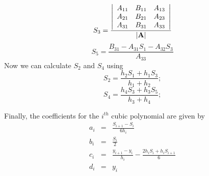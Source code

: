 %
\begin{equation}
    S_3 = \frac{
    \left|%
    \begin{array}{ccc}
       A_{11} & B_{11} & A_{13} \\
       A_{21} & B_{21} & A_{23} \\
       A_{31} & B_{31} & A_{33} \\
    \end{array}%
    \right|
    }
    {\mathbf{| \mathbf{A}|}}
\end{equation}
%
\begin{equation}
     S_5 = \frac{B_{31} - A_{31} S_1 - A_{32} S_3}{A_{33}}
\end{equation}
%
Now we can calculate $S_2$ and $S_4$ using
%
\begin{equation}
     S_2 = \frac{ h_2 S_1 + h_1 S_3  }{  h_1 + h_2 };
\end{equation}
%
\begin{equation}
     S_4 = \frac{ h_4 S_3 + h_3 S_5  }{  h_3 + h_4 };
\end{equation}
%

Finally, the coefficients for the $i^{th}$ cubic polynomial are
given by
\begin{eqnarray}
   a_i &=&  \frac{ S_{i+1} - S_i   }{ 6  h_i}\\
   b_i &=&  \frac{S_i}{2}\\
   c_i &=&  \frac{ y_{i+1} - y_i  }{ h_i } - \frac{ 2 h_i S_i + h_i S_{i+1} }{  6
   }\\
   d_i &=&  y_i
\end{eqnarray}

